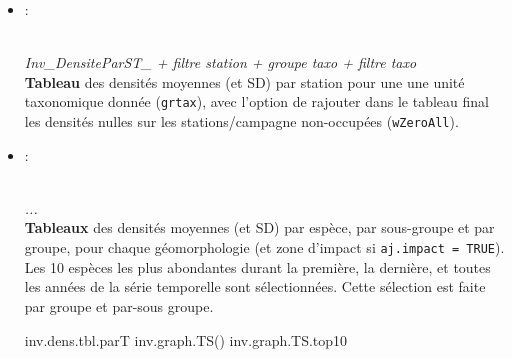 \documentclass{article}
\begin{document}
\begin{itemize}
   \item[] \hypertarget{i6}{:}\\
\emph{Inv\_DensiteParST\_ + filtre station + groupe taxo + filtre taxo}\\
\textbf{Tableau} des densités moyennes (et SD) par station pour une
une unité taxonomique donnée (\texttt{grtax}), avec l'option de
rajouter dans le tableau final les densités nulles sur les
stations/campagne non-occupées (\texttt{wZeroAll}).

\item[] \hypertarget{i7}{:}\\
  \emph{...}\\
  \textbf{Tableaux} des densités moyennes (et SD) par espèce, par
  sous-groupe et par groupe, pour chaque géomorphologie (et zone
  d'impact si \texttt{aj.impact = TRUE}). Les 10 espèces les plus
  abondantes durant la première, la
  dernière, et toutes les années de la série temporelle sont
  sélectionnées. Cette sélection est faite par groupe et par-sous
  groupe.

  inv.dens.tbl.parT
  inv.graph.TS()
  inv.graph.TS.top10

\end{itemize}
\end{document}
